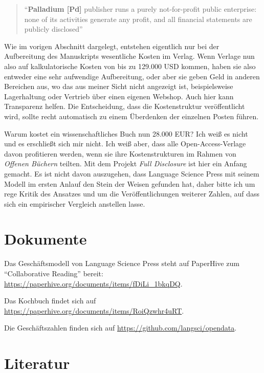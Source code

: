 \documentclass[a4paper,
fontsize=11pt,
oneside,
numbers=noperiodatend,
parskip=half-,
bibliography=totoc,
final
]{scrartcl}
\begin{document}
\begin{quote}
\enquote{\textbf{Palladium {[}Pd{]}} publisher runs a purely
not-for-profit public enterprise: none of its activities generate any
profit, and all financial statements are publicly disclosed}
\end{quote}

Wie im vorigen Abschnitt dargelegt, entstehen eigentlich nur bei der
Aufbereitung des Manuskripts wesentliche Kosten im Verlag. Wenn Verlage
nun also auf kalkulatorische Kosten von bis zu 129.000 USD kommen, haben
sie also entweder eine sehr aufwendige Aufbereitung, oder aber sie geben
Geld in anderen Bereichen aus, wo das aus meiner Sicht nicht angezeigt
ist, beispielsweise Lagerhaltung oder Vertrieb über einen eigenen
Webshop. Auch hier kann Transparenz helfen. Die Entscheidung, dass die
Kostenstruktur veröffentlicht wird, sollte recht automatisch zu einem
Überdenken der einzelnen Posten führen.

Warum kostet ein wissenschaftliches Buch nun 28.000 EUR? Ich weiß es
nicht und es erschließt sich mir nicht. Ich weiß aber, dass alle
Open-Access-Verlage davon profitieren werden, wenn sie ihre
Kostenstrukturen im Rahmen von \emph{Offenen Büchern} teilten. Mit dem
Projekt \emph{Full Disclosure} ist hier ein Anfang gemacht. Es ist nicht
davon auszugehen, dass Language Science Press mit seinem Modell im
ersten Anlauf den Stein der Weisen gefunden hat, daher bitte ich um rege
Kritik des Ansatzes und um die Veröffentlichungen weiterer Zahlen, auf
dass sich ein empirischer Vergleich anstellen lasse.

\hypertarget{dokumente}{%
\section{Dokumente}\label{dokumente}}

Das Geschäftsmodell von Language Science Press steht auf PaperHive zum
\enquote{Collaborative Reading} bereit:
\url{https://paperhive.org/documents/items/fDiLi_1bkqDQ}.

Das Kochbuch findet sich auf
\url{https://paperhive.org/documents/items/RoiQzwhr4uRT}.

Die Geschäftszahlen finden sich auf
\url{https://github.com/langsci/opendata}.

\hypertarget{literatur}{%
\section{Literatur}\label{literatur}}
\end{document}
